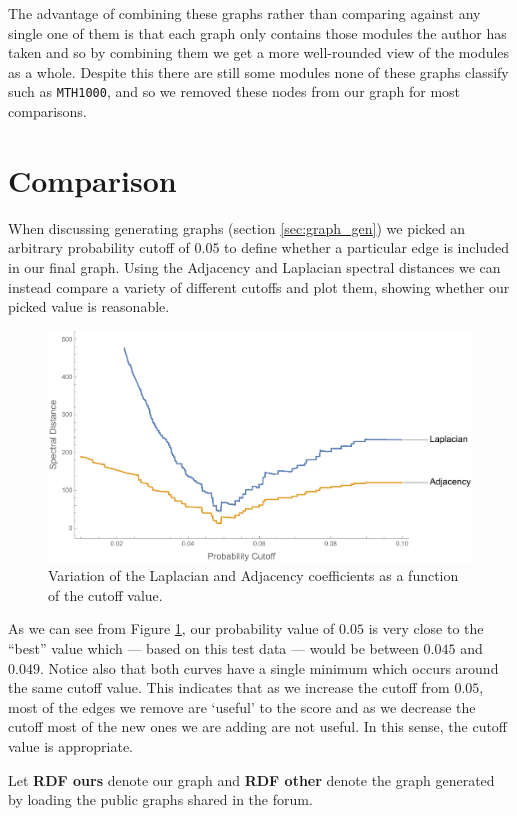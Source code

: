 \documentclass[english, 12pt]{article}
\begin{document}
The advantage of combining these graphs rather than comparing against any single one of them is that each graph only contains those modules the author has taken and so by combining them we get a more well-rounded view of the modules as a whole. Despite this there are still some modules none of these graphs classify such as \texttt{MTH1000}, and so we removed these nodes from our graph for most comparisons.

\section{Comparison}
When discussing generating graphs (section \ref{sec:graph_gen}) we picked an arbitrary probability cutoff of $0.05$ to define whether a particular edge is included in our final graph. Using the Adjacency and Laplacian spectral distances we can instead compare a variety of different cutoffs and plot them, showing whether our picked value is reasonable.
\begin{figure}[h!]
\centering
\includegraphics[scale=0.5]{CutoffComparison.pdf}
\caption{Variation of the Laplacian and Adjacency coefficients as a function of the cutoff value.}
\label{fig:cutoff_comp}
\end{figure}

As we can see from Figure \ref{fig:cutoff_comp}, our probability value of $0.05$ is very close to the ``best'' value which --- based on this test data --- would be between $0.045$ and $0.049$. Notice also that both curves have a single minimum which occurs around the same cutoff value. This indicates that as we increase the cutoff from $0.05$, most of the edges we remove are `useful' to the score and as we decrease the cutoff most of the new ones we are adding are not useful. In this sense, the cutoff value is appropriate.

Let {\bf RDF ours} denote our graph and {\bf RDF other} denote the graph generated by loading the public graphs shared in the forum.
\end{document}
